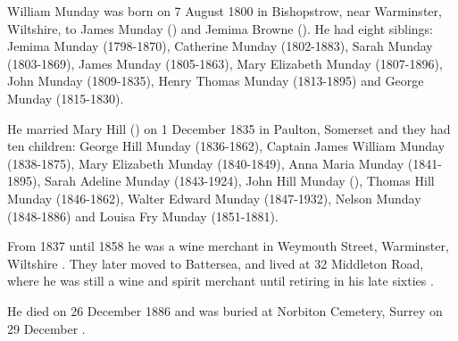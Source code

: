 
William Munday was born on 7 August 1800 \cite{WillMundayBirth} in Bishopstrow, near Warminster, Wiltshire, to James Munday () and Jemima Browne ().  He had eight siblings:  Jemima Munday (1798-1870), Catherine Munday (1802-1883), Sarah Munday (1803-1869), James Munday (1805-1863), Mary Elizabeth Munday (1807-1896), John Munday (1809-1835), Henry Thomas Munday (1813-1895) and George Munday (1815-1830).

He married Mary Hill () on 1 December 1835 in Paulton, Somerset and they had ten children:  George Hill Munday (1836-1862), Captain James William Munday (1838-1875), Mary Elizabeth Munday (1840-1849), Anna Maria Munday (1841-1895), Sarah Adeline Munday (1843-1924), John Hill Munday (), Thomas Hill Munday (1846-1862), Walter Edward Munday (1847-1932), Nelson Munday (1848-1886) and Louisa Fry Munday (1851-1881).

From 1837 until 1858 he was a wine merchant in Weymouth Street, Warminster, Wiltshire \cite{WillMundayOccupation}. They later moved to Battersea, and lived at 32 Middleton Road,  where he was still a wine and spirit merchant until retiring in his late sixties \cite{WillMundayBattersea}.

He died on 26 December 1886 and was buried at Norbiton Cemetery, Surrey on 29 December \cite{WillMundayDeath}.



